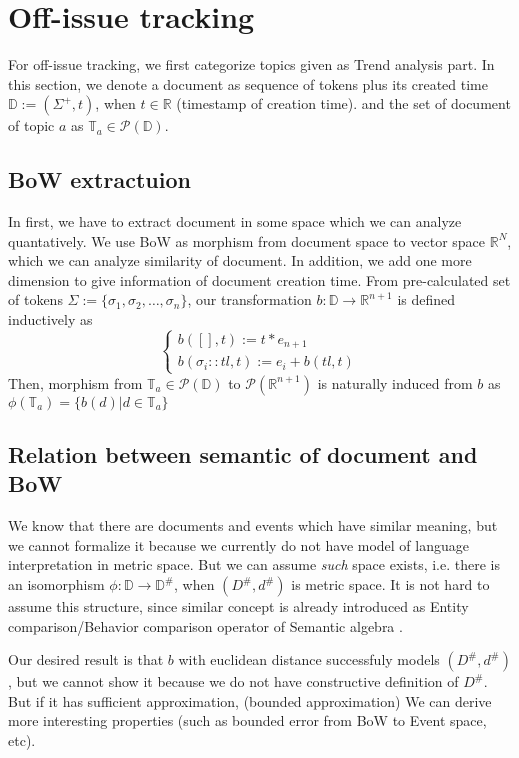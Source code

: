 \section{Off-issue tracking}
For off-issue tracking, we first categorize topics given as Trend analysis part.
In this section, we denote a document as sequence of tokens plus its created time $\mathbb{D} := (\Sigma^{+}, t)$, when $t \in \mathbb{R}$ (timestamp of creation time).
and the set of document of topic $a$ as $\mathbb{T}_{a} \in \mathcal{P}(\mathbb{D})$.

\subsection{BoW extractuion}
In first, we have to extract document in some space which we can analyze quantatively.
We use BoW as morphism from document space to vector space $\mathbb{R}^{N}$, which we can
analyze similarity of document. In addition, we add one more dimension to give information
of document creation time. From pre-calculated set of tokens $\Sigma := \{ \sigma_{1}, \sigma_{2}, \ldots, \sigma_{n} \}$,
our transformation $b: \mathbb{D} \rightarrow \mathbb{R}^{n+1}$ is defined inductively as
\[
\begin{cases}
    b([], t) := t * e_{n+1}\\
    b(\sigma_{i} :: tl, t) := e_{i} + b(tl, t)
\end{cases} 
\]
Then, morphism from $\mathbb{T}_{a} \in \mathcal{P}(\mathbb{D})$ to $\mathcal{P}(\mathbb{R}^{n+1})$ is naturally induced from $b$ as
$\phi(\mathbb{T}_{a}) = \{b(d) | d \in \mathbb{T}_{a}\}$

\subsection{Relation between semantic of document and BoW}
We know that there are documents and events which have similar meaning, but we cannot formalize it because we currently do not have
model of language interpretation in metric space. But we can assume \textit{such} space exists, i.e. there is an isomorphism
$\phi: \mathbb{D} \rightarrow \mathbb{D}^{\#}$, when $(D^{\#}, d^{\#})$ is metric space. It is not hard to assume this structure,
since similar concept is already introduced as Entity comparison/Behavior comparison operator of Semantic algebra \cite{wang2013semantic}.

Our desired result is that $b$ with euclidean distance successfuly models $(D^{\#}, d^{\#})$, but we cannot show it because we do not have
constructive definition of $D^{\#}$. But if it has sufficient approximation, (bounded approximation)
We can derive more interesting properties (such as bounded error from BoW to Event space, etc).

